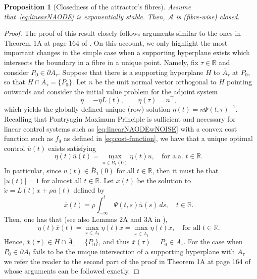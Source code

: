 \documentclass[reqno]{amsart}
\newtheorem{prop}[thm]{Proposition}
\theoremstyle{definition}
\numberwithin{equation}{section}
\newcommand{\R}{\mathbb{R}}
\newcommand{\A}{\mathcal{A}}
\newcommand\note[1]{\marginpar{\flushleft\sffamily\tiny #1}}
\begin{document}
\begin{prop}[Closedness of the attractor's fibres]
     Assume that~\eqref{eq:linearNAODE} is exponentially stable.  Then, $\A$ is (fibre-wise) closed.
\end{prop}
\begin{proof}
The proof of this result closely follows arguments similar to the ones in Theorem 1A at page 164 of \cite{lee1986foundations}. On this account, we only highlight the most important changes in the simple case when a supporting hyperplane exists which intersects the boundary in a fibre in a unique point. Namely, fix $\tau \in\R$  and  consider $P_0\in\partial A_{\tau}$. 
    Suppose that there is a  supporting hyperplane $H$ to $\overline A_{\tau}$ at $P_0$, so that $H\cap \overline A_{\tau}=\{P_0\}$. 
    Let $n$ be the unit normal vector orthogonal to $H$ pointing outwards and consider the initial value problem for the adjoint system 
    \[
    \dot \eta =-\eta L(t),\qquad \eta(\tau)=n^\top,
    \]
    which yields the globally defined unique (row) solution $\eta(t)=n\Psi(t,\tau)^{-1}$. Recalling that Pontryagin Maximum Principle is sufficient and necessary for linear control systems such as \eqref{eq:linearNAODEwNOISE} with a convex cost function such as $f_0$ as defined in \eqref{eq:cost-function}, we have that a unique optimal control $\overline u(t)$ exists satisfying
    \[
    \eta(t)\overline u(t)=\max_{u\in \overline B_1(0)}\eta(t)u, \quad \text{for a.a. }t\in\R.
    \]
    In particular, since $u(t)\in \overline B_1(0)$ for all $t\in\R$, then it must be that $|\overline u(t)|=1$ for almost all $t\in\R$. Let $\overline x(t)$ be the solution to $\dot x =L(t)x+\rho\overline u(t)$ defined by
    \[
    \overline x(t)=\rho\int_{-\infty}^t\Psi(t,s)\overline u(s)\, ds,\quad t\in\R.
    \]
    Then, one has that (see also Lemmas 2A and 3A in \cite{lee1986foundations}), 
    \[
    \eta(t)\overline x(t)=\max_{x\in A_t}\eta(t) x=\max_{x\in \overline A_t}\eta(t) x,\quad \text{for all } t\in\R.
    \]
    Hence, $\overline x(\tau)\in H\cap\overline  A_\tau=\{P_0\}$, and thus $\overline x(\tau)=P_0\in A_\tau $. For the case when  $P_0\in\partial A_t$ fails to be the unique intersection of a supporting hyperplane with $A_\tau$ we refer the reader to the second part of the proof in Theorem 1A at page 164 of \cite{lee1986foundations} whose arguments can be followed exactly. 
\end{proof}
\end{document}
